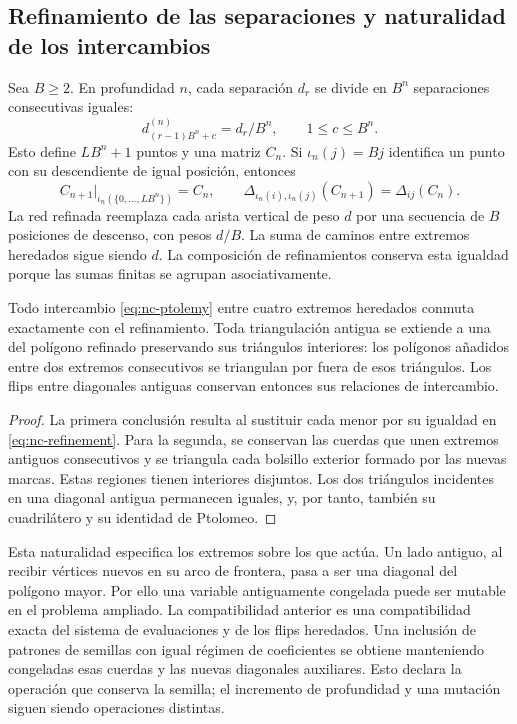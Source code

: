 \subsection{Refinamiento de las separaciones y naturalidad de los intercambios}

Sea \(B\ge2\). En profundidad \(n\), cada separación \(d_r\) se divide
en \(B^n\) separaciones consecutivas iguales:
\[
 d^{(n)}_{(r-1)B^n+c}=d_r/B^n,
 \qquad 1\le c\le B^n.
\]
Esto define \(LB^n+1\) puntos y una matriz \(C_n\). Si \(\iota_n(j)=Bj\)
identifica un punto con su descendiente de igual posición, entonces
\begin{equation}
 C_{n+1}|_{\iota_n(\{0,\ldots,LB^n\})}=C_n,
 \qquad
 \Delta_{\iota_n(i),\iota_n(j)}(C_{n+1})=\Delta_{ij}(C_n).
 \label{eq:nc-refinement}
\end{equation}
La red refinada reemplaza cada arista vertical de peso \(d\) por una
secuencia de \(B\) posiciones de descenso, con pesos \(d/B\). La suma
de caminos entre extremos heredados sigue siendo \(d\). La composición de
refinamientos conserva esta igualdad porque las sumas finitas se agrupan
asociativamente.

\begin{proposition}
\label{prop:nc-inherited}
Todo intercambio \eqref{eq:nc-ptolemy} entre cuatro extremos heredados
conmuta exactamente con el refinamiento. Toda triangulación antigua se
extiende a una del polígono refinado preservando sus triángulos interiores:
los polígonos añadidos entre dos extremos consecutivos se triangulan por
fuera de esos triángulos. Los flips entre diagonales antiguas conservan
entonces sus relaciones de intercambio.
\end{proposition}
\begin{proof}
La primera conclusión resulta al sustituir cada menor por su igualdad en
\eqref{eq:nc-refinement}. Para la segunda, se conservan las cuerdas que
unen extremos antiguos consecutivos y se triangula cada bolsillo exterior
formado por las nuevas marcas. Estas regiones tienen interiores disjuntos.
Los dos triángulos incidentes en una diagonal antigua permanecen iguales,
y, por tanto, también su cuadrilátero y su identidad de Ptolomeo.
\end{proof}

Esta naturalidad especifica los extremos sobre los que actúa. Un lado
antiguo, al recibir vértices nuevos en su arco de frontera, pasa a ser una
diagonal del polígono mayor. Por ello una variable antiguamente congelada
puede ser mutable en el problema ampliado. La compatibilidad anterior es
una compatibilidad exacta del sistema de evaluaciones y de los flips
heredados. Una inclusión de patrones de semillas con igual régimen de
coeficientes se obtiene manteniendo congeladas esas cuerdas y las nuevas
diagonales auxiliares. Esto declara la operación que conserva la semilla;
el incremento de profundidad y una mutación siguen siendo operaciones
distintas.

